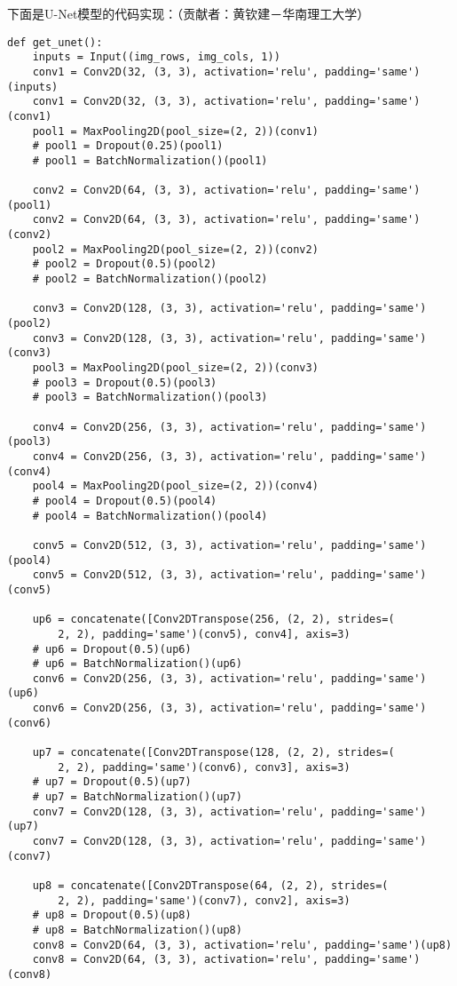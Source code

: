 下面是U-Net模型的代码实现：（贡献者：黄钦建－华南理工大学）

\begin{verbatim}
def get_unet():
    inputs = Input((img_rows, img_cols, 1))
    conv1 = Conv2D(32, (3, 3), activation='relu', padding='same')(inputs)
    conv1 = Conv2D(32, (3, 3), activation='relu', padding='same')(conv1)
    pool1 = MaxPooling2D(pool_size=(2, 2))(conv1)
    # pool1 = Dropout(0.25)(pool1)
    # pool1 = BatchNormalization()(pool1)

    conv2 = Conv2D(64, (3, 3), activation='relu', padding='same')(pool1)
    conv2 = Conv2D(64, (3, 3), activation='relu', padding='same')(conv2)
    pool2 = MaxPooling2D(pool_size=(2, 2))(conv2)
    # pool2 = Dropout(0.5)(pool2)
    # pool2 = BatchNormalization()(pool2)

    conv3 = Conv2D(128, (3, 3), activation='relu', padding='same')(pool2)
    conv3 = Conv2D(128, (3, 3), activation='relu', padding='same')(conv3)
    pool3 = MaxPooling2D(pool_size=(2, 2))(conv3)
    # pool3 = Dropout(0.5)(pool3)
    # pool3 = BatchNormalization()(pool3)

    conv4 = Conv2D(256, (3, 3), activation='relu', padding='same')(pool3)
    conv4 = Conv2D(256, (3, 3), activation='relu', padding='same')(conv4)
    pool4 = MaxPooling2D(pool_size=(2, 2))(conv4)
    # pool4 = Dropout(0.5)(pool4)
    # pool4 = BatchNormalization()(pool4)

    conv5 = Conv2D(512, (3, 3), activation='relu', padding='same')(pool4)
    conv5 = Conv2D(512, (3, 3), activation='relu', padding='same')(conv5)

    up6 = concatenate([Conv2DTranspose(256, (2, 2), strides=(
        2, 2), padding='same')(conv5), conv4], axis=3)
    # up6 = Dropout(0.5)(up6)
    # up6 = BatchNormalization()(up6)
    conv6 = Conv2D(256, (3, 3), activation='relu', padding='same')(up6)
    conv6 = Conv2D(256, (3, 3), activation='relu', padding='same')(conv6)

    up7 = concatenate([Conv2DTranspose(128, (2, 2), strides=(
        2, 2), padding='same')(conv6), conv3], axis=3)
    # up7 = Dropout(0.5)(up7)
    # up7 = BatchNormalization()(up7)
    conv7 = Conv2D(128, (3, 3), activation='relu', padding='same')(up7)
    conv7 = Conv2D(128, (3, 3), activation='relu', padding='same')(conv7)

    up8 = concatenate([Conv2DTranspose(64, (2, 2), strides=(
        2, 2), padding='same')(conv7), conv2], axis=3)
    # up8 = Dropout(0.5)(up8)
    # up8 = BatchNormalization()(up8)
    conv8 = Conv2D(64, (3, 3), activation='relu', padding='same')(up8)
    conv8 = Conv2D(64, (3, 3), activation='relu', padding='same')(conv8)


\end{verbatim}
